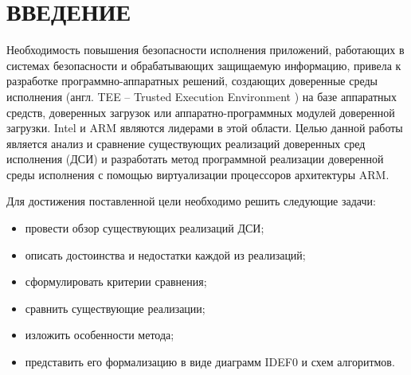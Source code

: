 \section*{ВВЕДЕНИЕ}

Необходимость повышения безопасности исполнения приложений, работающих в системах безопасности и обрабатывающих защищаемую информацию, привела к разработке программно-аппаратных решений, создающих доверенные среды исполнения (англ. TEE -- Trusted Execution Environment \cite{tee}) на базе аппаратных средств, доверенных загрузок или аппаратно-программных модулей доверенной загрузки. Intel \cite{intel} и ARM \cite{arm} являются лидерами в этой области. Целью данной работы является анализ и сравнение существующих реализаций доверенных сред исполнения (ДСИ) и разработать метод программной реализации доверенной среды исполнения с помощью виртуализации процессоров архитектуры ARM.

Для достижения поставленной цели необходимо решить следующие задачи:

\begin{itemize}
	\item провести обзор существующих реализаций ДСИ;
	\item описать достоинства и недостатки каждой из реализаций;
	\item сформулировать критерии сравнения;
	\item сравнить существующие реализации;
	\item изложить особенности метода;
	\item представить его формализацию в виде диаграмм IDEF0 и схем алгоритмов.
\end{itemize}

\pagebreak
